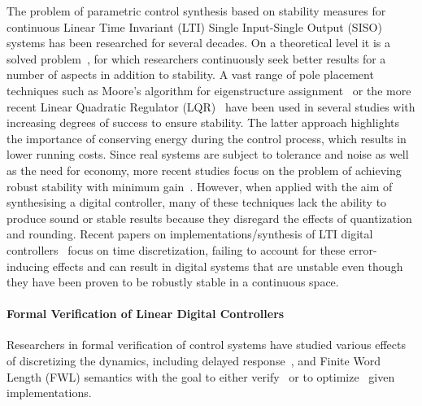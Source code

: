 \documentclass[final]{sig-alternate-05-2015}
\begin{document}
The problem of parametric control synthesis based on stability measures for
continuous Linear Time Invariant (LTI) Single Input-Single Output (SISO)
systems has been researched for several decades.  On a theoretical level it
is a solved problem~\cite{wonham1967pole}, for which researchers
continuously seek better results for a number of aspects in addition to
stability.  A vast range of pole placement techniques such as Moore's
algorithm for eigenstructure assignment~\cite{klein1977eigenvalue} or the
more recent Linear Quadratic Regulator (LQR)~\cite{bemporad2002explicit}
have been used in several studies with increasing degrees of success to
ensure stability.  The latter approach highlights the importance of
conserving energy during the control process, which results in lower running
costs.  Since real systems are subject to tolerance and noise as well as the
need for economy, more recent studies focus on the problem of achieving
robust stability with minimum gain~\cite{schmid2014unified,
konigorski2012pole}.  However, when applied with the aim of synthesising a
digital controller, many of these techniques lack the ability to produce
sound or stable results because they disregard the effects of quantization
and rounding.  Recent papers on implementations/synthesis of LTI digital
controllers~\cite{das2013lqr, ghosh2013fpga} focus on time discretization,
failing to account for these error-inducing effects and can result in digital 
systems that are unstable even though they have been proven to be
robustly stable in a continuous space.  

\paragraph{Formal Verification of Linear Digital Controllers} 

Researchers in formal verification of control systems have studied various
effects of discretizing the dynamics, including delayed
response~\cite{Duggirala2015}, and Finite Word Length (FWL) semantics with
the goal to either verify~\cite{daes20161} or to optimize~\cite{oudjida2014design} 
given implementations.
\end{document}
